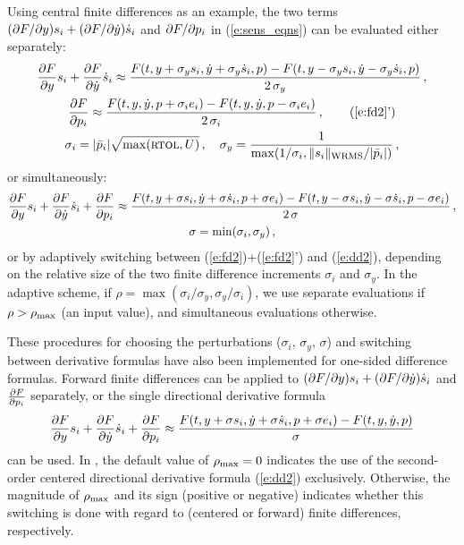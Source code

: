 Using central finite differences as an example, the two terms 
$(\partial F / \partial y) s_i + (\partial F / \partial \dot y) \dot s_i$ and $\partial F / \partial p_i$ in (\ref{e:sens_eqns}) 
can be evaluated either separately:
\begin{gather}
  \dFdy s_i + \dFdyp \dot s_i \approx
  \frac{F(t, y+\sigma_y s_i, \dot y + \sigma_y \dot s_i , p)- F(t, y-\sigma_y s_i, \dot y - \sigma_y \dot s_i , p)}{2\,\sigma_y} \, , \label{e:fd2} \\
  \dFdpi \approx 
  \frac{F(t, y, \dot y, p + \sigma_i e_i)- F(t, y, \dot y, p - \sigma_i e_i)}{2\,\sigma_i} \, , \tag{\ref{e:fd2}'} \\
  \sigma_i = |{\bar p}_i| \sqrt{\max( \mbox{\sc rtol} , U)} \, , \quad
  \sigma_y = \frac{1}{\max(1/\sigma_i, \|s_i\|_{\mbox{\scriptsize WRMS}}/|{\bar p}_i|)} \, , \nonumber
\end{gather}
or simultaneously:
\begin{gather}
  \frac{\partial F}{\partial y} s_i + \frac{\partial F}{\partial \dot y} \dot s_i + \frac{\partial F}{\partial p_i} \approx
  \frac{F(t, y+\sigma s_i, \dot y + \sigma \dot s_i , p + \sigma e_i) -
    F(t, y-\sigma s_i, \dot y - \sigma \dot s_i , p - \sigma e_i)}{2\,\sigma} \, , \label{e:dd2} \\
  \sigma = \min(\sigma_i, \sigma_y) \, , \nonumber
\end{gather}
or by adaptively switching between (\ref{e:fd2})+(\ref{e:fd2}') and (\ref{e:dd2}), 
depending on the relative size of the two finite difference increments
$\sigma_i$ and $\sigma_y$.  In the adaptive scheme, if
$\rho = \max(\sigma_i/\sigma_y,\sigma_y/\sigma_i)$, we use separate evaluations
if $\rho > \rho_{\max}$ (an input value), and simultaneous evaluations otherwise.

These procedures for choosing the perturbations ($\sigma_i$, $\sigma_y$, $\sigma$)
and switching between derivative 
formulas have also been implemented for one-sided difference formulas.
Forward finite differences can be applied to $(\partial F / \partial y) s_i + (\partial F / \partial \dot y) \dot s_i$ and
$\frac{\partial F}{\partial p_i}$ separately, or the single directional derivative formula
\begin{equation*}
\frac{\partial F}{\partial y} s_i + \frac{\partial F}{\partial \dot y} \dot s_i + \frac{\partial F}{\partial p_i} \approx
\frac{F(t, y+\sigma s_i, \dot y + \sigma \dot s_i , p + \sigma e_i) - F(t, y, \dot y, p)}{\sigma}
\end{equation*}
can be used. In {\idas}, the default value of $\rho_{\max}=0$ indicates the use of
the second-order centered directional derivative formula (\ref{e:dd2}) exclusively.
Otherwise, the magnitude of $\rho_{\max}$ and its sign (positive or
negative) indicates whether this switching is done with regard to
(centered or forward) finite differences, respectively.

